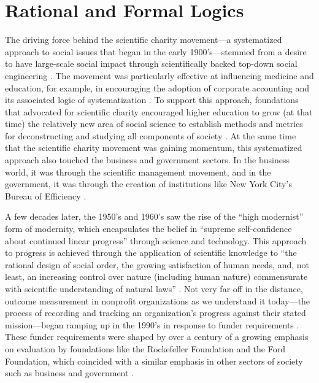 \section{Rational and Formal Logics}
The driving force behind the scientific charity movement---a systematized approach to social issues that began in the early 1900’s---stemmed from a desire to have large-scale social impact through scientifically backed top-down social engineering \citep{Sealander2003Curing}. The movement was particularly effective at influencing medicine and education, for example, in encouraging the adoption of corporate accounting and its associated logic of systematization \citep{Sealander2003Curing}. To support this approach, foundations that advocated for scientific charity encouraged higher education to grow (at that time) the relatively new area of social science to establish methods and metrics for deconstructing and studying all components of society \citep{Sealander2003Curing}. At the same time that the scientific charity movement was gaining momentum, this systematized approach also touched the business and government sectors. In the business world, it was through the scientific management movement, and in the government, it was through the creation of institutions like New York City's Bureau of Efficiency \citep{Brest2020Outcomes}.

A few decades later, the 1950’s and 1960’s saw the rise of the “high modernist” form of modernity, which encapsulates the belief in “supreme self-confidence about continued linear progress” \citep{Scott1998Seeing} through science and technology. This approach to progress is achieved through the application of scientific knowledge to “the rational design of social order, the growing satisfaction of human needs, and, not least, an increasing control over nature (including human nature) commensurate with scientific understanding of natural laws” \citep{Scott1998Seeing}. Not very far off in the distance, outcome measurement in nonprofit organizations as we understand it today---the process of recording and tracking an organization’s progress against their stated mission---began ramping up in the 1990’s in response to funder requirements \citep{Benjamin2012FrontOut,Brest2020Outcomes}. These funder requirements were shaped by over a century of a growing emphasis on evaluation by foundations like the Rockefeller Foundation and the Ford Foundation, which coincided with a similar emphasis in other sectors of society such as business and government \citep{Brest2020Outcomes}.

